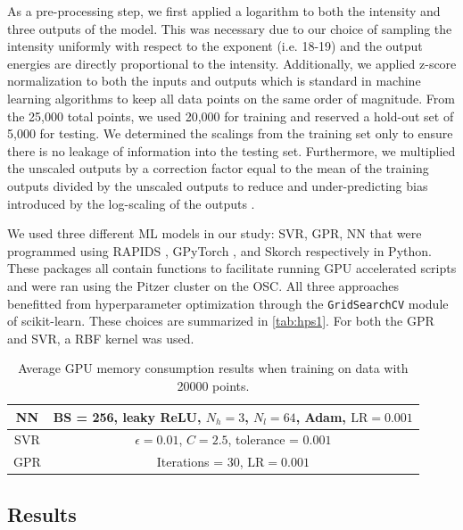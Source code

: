 As a pre-processing step, we first applied a logarithm to both the intensity and three outputs of the model. This was necessary due to our choice of sampling the intensity uniformly with respect to the exponent (i.e. 18-19) and the output energies are directly proportional to the intensity. Additionally, we applied z-score normalization to both the inputs and outputs which is standard in machine learning algorithms to keep all data points on the same order of magnitude. From the 25,000 total points, we used 20,000 for training and reserved a hold-out set of 5,000 for testing. We determined the scalings from the training set only to ensure there is no leakage of information into the testing set. Furthermore, we multiplied the unscaled outputs by a correction factor equal to the mean of the training outputs divided by the unscaled outputs to reduce and under-predicting bias introduced by the log-scaling of the outputs \cite{Miller_1984_AmStat}.

We used three different \gls{ML} models in our study: \gls{SVR}, \gls{GPR}, \gls{NN} that were programmed using RAPIDS \cite{2023_RAPIDS}, GPyTorch \cite{Gardner_2018_GPytorch}, and Skorch \cite{Tietz_2017_Skorch} respectively in Python. These packages all contain functions to facilitate running \gls{GPU} accelerated scripts and were ran using the Pitzer cluster on the \gls{OSC}. All three approaches benefitted from hyperparameter optimization through the \texttt{GridSearchCV} module of scikit-learn. These choices are summarized in \autoref{tab:hps1}. For both the \gls{GPR} and \gls{SVR}, a \gls{RBF} kernel was used.

\begin{table}
	\centering
	\begin{tabular}{|c|c|}
			\hline
			NN & BS = 256, leaky ReLU, $N_h = 3$, $N_l = 64$, Adam, $\text{LR}=0.001$ \\
			\hline
			SVR & $\epsilon = 0.01$, $C = 2.5$, tolerance = $0.001$ \\
			\hline
			GPR & Iterations = 30, $\text{LR}=0.001$ \\
			\hline
	\end{tabular}
	\caption{Average GPU memory consumption results when training on data with 20000 points.}
	\label{tab:hps1}
\end{table}

\subsection{Results}

